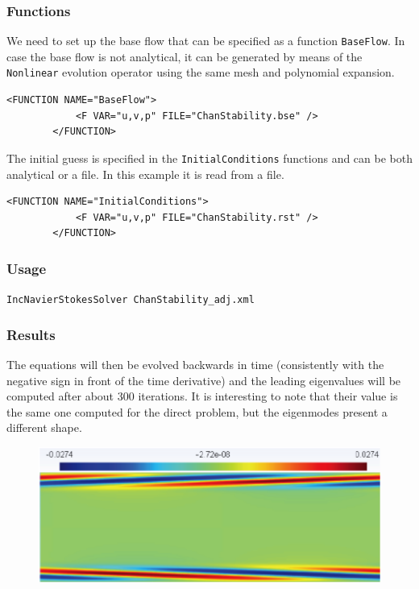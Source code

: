 \subsubsection{Functions}

We need to set up the base flow that can be specified as a function \texttt{BaseFlow}. In case the base flow is not analytical, it can be generated by means of the \texttt{Nonlinear} evolution operator using the same mesh and polynomial expansion.

    \begin{lstlisting}[style=XMLStyle]
        <FUNCTION NAME="BaseFlow">
            <F VAR="u,v,p" FILE="ChanStability.bse" />
        </FUNCTION>
  \end{lstlisting}
  
  The initial guess is specified in the \texttt{InitialConditions} functions and can be both analytical or a file. In this example it is read from a file. 
  
      \begin{lstlisting}[style=XMLStyle]
        <FUNCTION NAME="InitialConditions">
            <F VAR="u,v,p" FILE="ChanStability.rst" />
        </FUNCTION>
          \end{lstlisting}

\subsubsection{Usage}

\texttt{IncNavierStokesSolver ChanStability\_adj.xml}

\subsubsection{Results}

The equations will then be evolved backwards in time (consistently with the negative sign in front of the time derivative) and the leading eigenvalues will be computed after about 300 iterations. It is interesting to note that their value is the same one computed for the direct problem, but the eigenmodes present a different shape.


\begin{figure}[!htbp]
\centering
 {\includegraphics[width=1 \textwidth]{Figures/chan_u_adj.png}}
   \caption {}
\end{figure}

